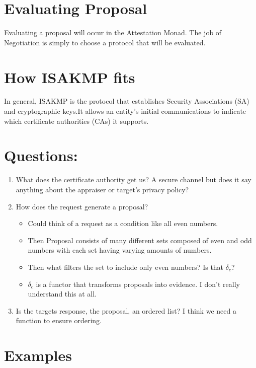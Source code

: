 \documentclass[10pt]{article}
\begin{document}
  
  
\section {Evaluating Proposal}

Evaluating a proposal will occur in the Attestation Monad. The job of Negotiation is simply to choose a protocol that will be evaluated. 

\section {How ISAKMP fits} 

In general, ISAKMP is the protocol that establishes Security Associations (SA) and cryptographic keys.It allows an entity's initial communications to indicate which certificate authorities (CAs) it supports.   

\section {Questions:}
\begin{enumerate}
  \item What does the certificate authority get us? A secure channel but 
        does it say anything about the appraiser or target's
        privacy policy?
  \item How does the request generate a proposal? 
  \begin{itemize}
    \item Could think of a request as a condition like all even numbers.
    \item Then Proposal consists of many different sets composed of even
          and odd numbers with each set having varying amounts of numbers.
    \item Then what filters the set to include only even numbers?
          Is that $\delta_c$?
    \item $\delta_c$ is a functor that transforms proposals into evidence.
          I don't really understand this at all.  
  \end{itemize}
  \item Is the targets response, the proposal, an ordered list?
        I think we need a function to ensure ordering.
\end{enumerate}

\section {Examples}
\end{document}
